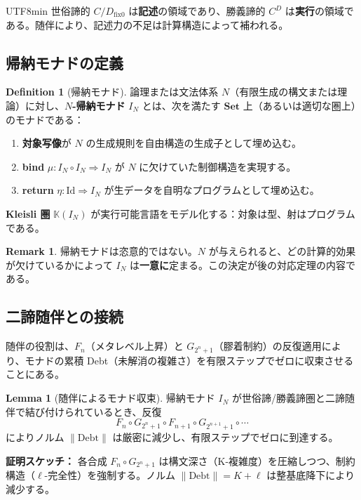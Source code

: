 \documentclass[a4paper,11pt]{article}
\renewcommand{\emph}[1]{\textbf{#1}}
\theoremstyle{definition}
\newtheorem{definition}{Definition}[section]
\newtheorem{lemma}{Lemma}[section]
\newtheorem{remark}{Remark}[section]
\begin{document}
\begin{CJK}{UTF8}{min}
世俗諦的 $C/D_{\mathrm{fix}0}$ は\emph{記述}の領域であり、勝義諦的 $C^D$ は\emph{実行}の領域である。随伴により、記述力の不足は計算構造によって補われる。

\subsection{帰納モナドの定義}

\begin{definition}[帰納モナド]
論理または文法体系 $N$（有限生成の構文または理論）に対し、\emph{$N$-帰納モナド} $I_N$ とは、次を満たす $\mathbf{Set}$ 上（あるいは適切な圏上）のモナドである：

\begin{enumerate}
  \item \emph{対象写像}が $N$ の生成規則を自由構造の生成子として埋め込む。
  \item \emph{bind} $\mu : I_N \circ I_N \Rightarrow I_N$ が $N$ に欠けていた制御構造を実現する。
  \item \emph{return} $\eta : \text{Id} \Rightarrow I_N$ が生データを自明なプログラムとして埋め込む。
\end{enumerate}

\emph{Kleisli 圏} $\mathbb{K}(I_N)$ が実行可能言語をモデル化する：対象は型、射はプログラムである。
\end{definition}

\begin{remark}
帰納モナドは恣意的ではない。$N$ が与えられると、どの計算的効果が欠けているかによって $I_N$ は\emph{一意に}定まる。この決定が後の対応定理の内容である。
\end{remark}

\subsection{二諦随伴との接続}

随伴の役割は、$F_n$（メタレベル上昇）と $G_{2^n+1}$（膠着制約）の反復適用により、モナドの累積 Debt（未解消の複雑さ）を有限ステップでゼロに収束させることにある。

\begin{lemma}[随伴によるモナド収束]
帰納モナド $I_N$ が世俗諦/勝義諦圏と二諦随伴で結び付けられているとき、反復
\[
  F_n \circ G_{2^n+1} \circ F_{n+1} \circ G_{2^{n+1}+1} \circ \cdots
\]
によりノルム $\|\text{Debt}\|$ は厳密に減少し、有限ステップでゼロに到達する。

\emph{証明スケッチ：} 各合成 $F_n \circ G_{2^n+1}$ は構文深さ（K-複雑度）を圧縮しつつ、制約構造（\(\ell\)-完全性）を強制する。ノルム $\|\text{Debt}\| = K + \ell$ は整基底降下により減少する。
\end{lemma}


\end{CJK}
\end{document}
